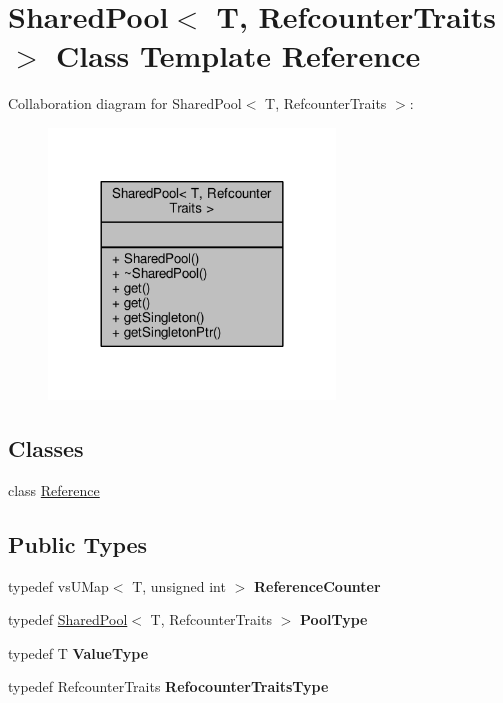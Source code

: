 \hypertarget{classSharedPool}{}\section{Shared\+Pool$<$ T, Refcounter\+Traits $>$ Class Template Reference}
\label{classSharedPool}


Collaboration diagram for Shared\+Pool$<$ T, Refcounter\+Traits $>$\+:
\nopagebreak
\begin{figure}[H]
\begin{center}
\leavevmode
\includegraphics[width=216pt]{d7/d52/classSharedPool__coll__graph}
\end{center}
\end{figure}
\subsection*{Classes}
\begin{DoxyCompactItemize}
\item 
class \hyperlink{classSharedPool_1_1Reference}{Reference}
\end{DoxyCompactItemize}
\subsection*{Public Types}
\begin{DoxyCompactItemize}
\item 
typedef vs\+U\+Map$<$ T, unsigned int $>$ {\bfseries Reference\+Counter}\hypertarget{classSharedPool_a731c4f9d4bd2696c903b77e7fe060dff}{}\label{classSharedPool_a731c4f9d4bd2696c903b77e7fe060dff}

\item 
typedef \hyperlink{classSharedPool}{Shared\+Pool}$<$ T, Refcounter\+Traits $>$ {\bfseries Pool\+Type}\hypertarget{classSharedPool_aab69a63ae62757064fc21b00eacbc1c4}{}\label{classSharedPool_aab69a63ae62757064fc21b00eacbc1c4}

\item 
typedef T {\bfseries Value\+Type}\hypertarget{classSharedPool_a90e105eda2f7f04ac0be0e54355d62ea}{}\label{classSharedPool_a90e105eda2f7f04ac0be0e54355d62ea}

\item 
typedef Refcounter\+Traits {\bfseries Refocounter\+Traits\+Type}\hypertarget{classSharedPool_ad542245d96d16ca83ee4022921a19e10}{}\label{classSharedPool_ad542245d96d16ca83ee4022921a19e10}

\end{DoxyCompactItemize}
